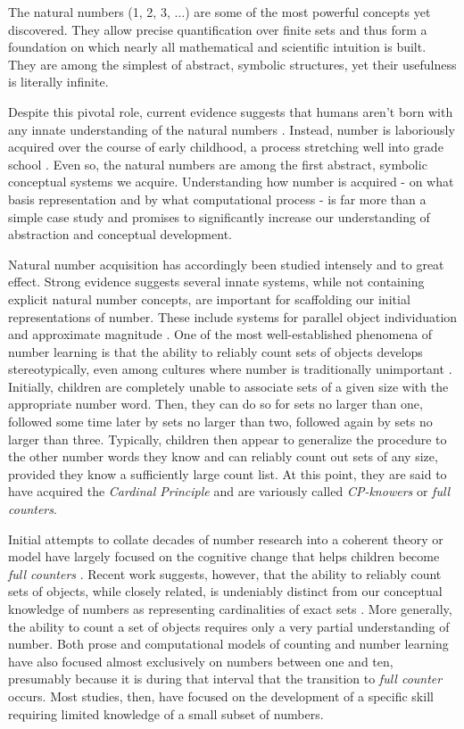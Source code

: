 \documentclass[10pt,letterpaper]{article}
\begin{document}
The natural numbers (1, 2, 3, $\ldots$) are some of the most powerful
concepts yet discovered. They allow precise quantification over finite
sets and thus form a foundation on which nearly all mathematical and
scientific intuition is built. They are among the simplest of
abstract, symbolic structures, yet their usefulness is literally
infinite.

Despite this pivotal role, current evidence suggests that humans
aren't born with any innate understanding of the natural numbers
\citep{Car2009}. Instead, number is laboriously acquired over the
course of early childhood, a process stretching well into grade school
\citep{Nat2010}. Even so, the natural numbers are among the first
abstract, symbolic conceptual systems we acquire. Understanding how
number is acquired - on what basis representation and by what
computational process - is far more than a simple case study and
promises to significantly increase our understanding of abstraction
and conceptual development.

Natural number acquisition has accordingly been studied intensely and
to great effect. Strong evidence suggests several innate systems,
while not containing explicit natural number concepts, are important
for scaffolding our initial representations of number. These include
systems for parallel object individuation and approximate magnitude
\citep{feigenson2004core}. One of the most well-established phenomena
of number learning is that the ability to reliably count sets of
objects develops stereotypically, even among cultures where number is
traditionally unimportant \citep{Wyn1992,JarPianSpelEtAl2014}.
Initially, children are completely unable to associate sets of a given
size with the appropriate number word. Then, they can do so for sets
no larger than one, followed some time later by sets no larger than
two, followed again by sets no larger than three. Typically, children
then appear to generalize the procedure to the other number words they
know and can reliably count out sets of any size, provided they know a
sufficiently large count list. At this point, they are said to have
acquired the \emph{Cardinal Principle} and are variously called
\emph{CP-knowers} or \emph{full counters}.

Initial attempts to collate decades of number research into a coherent
theory or model have largely focused on the cognitive change that
helps children become \emph{full counters}
\citep{Car2009,PianGoodTen2012}. Recent work suggests, however, that
the ability to reliably count sets of objects, while closely related,
is undeniably distinct from our conceptual knowledge of numbers as
representing cardinalities of exact sets
\citep{DavEngBar2012,izard2014toward,JarPianSpelEtAl2014}. More
generally, the ability to count a set of objects requires only a very
partial understanding of number. Both prose and computational models
of counting and number learning have also focused almost exclusively
on numbers between one and ten, presumably because it is during that
interval that the transition to \emph{full counter} occurs. Most
studies, then, have focused on the development of a specific skill
requiring limited knowledge of a small subset of numbers.
\end{document}
